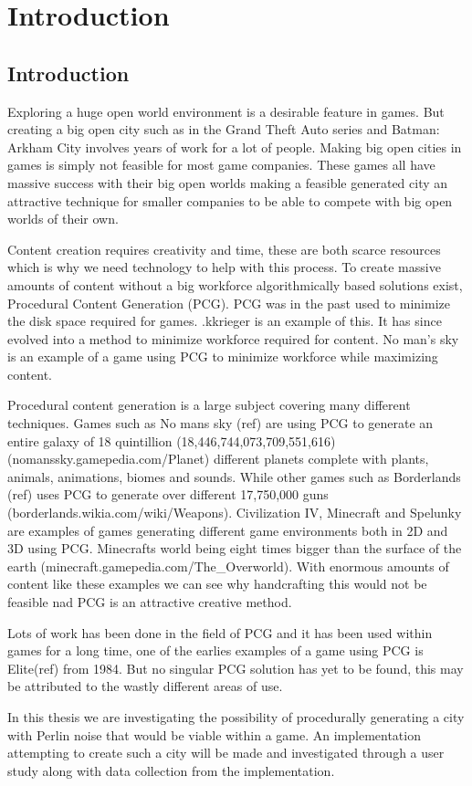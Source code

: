 \section{Introduction}
\subsection{Introduction}
Exploring a huge open world environment is a desirable feature in games. But creating a big open city such as in the Grand Theft Auto series and Batman: Arkham City involves years of work for a lot of people. Making big open cities in games is simply not feasible for most game companies. These games all have massive success with their big open worlds making a feasible generated city an attractive technique for smaller companies to be able to compete with big open worlds of their own.
\par
Content creation requires creativity and time, these are both scarce resources which is why we need technology to help with this process.
To create massive amounts of content without a big workforce algorithmically based solutions exist, Procedural Content Generation (PCG). PCG was in the past used to minimize the disk space required for games. .kkrieger is an  example of this. It has since evolved into a method to minimize workforce required for content. No man’s sky is an example of a game using PCG to minimize workforce while maximizing content.
\par
Procedural content generation is a large subject covering many different techniques. Games such as No mans sky (ref) are using PCG to generate an entire galaxy of 18 quintillion (18,446,744,073,709,551,616) (nomanssky.gamepedia.com/Planet) different planets complete with plants, animals, animations, biomes and sounds. While other games such as Borderlands (ref) uses PCG to generate over different 17,750,000 guns (borderlands.wikia.com/wiki/Weapons). Civilization IV, Minecraft and Spelunky are examples of games generating different game environments both in 2D and 3D using PCG. Minecrafts world being eight times bigger than the surface of the earth (minecraft.gamepedia.com/The\_Overworld). With enormous amounts of content like these examples we can see why handcrafting this would not be feasible nad PCG is an attractive creative method.
\par
Lots of work has been done in the field of PCG and it has been used within games for a long time, one of the earlies examples of a game using PCG is Elite(ref) from 1984. But no singular PCG solution has yet to be found, this may be attributed to the wastly different areas of use.
\par
In this thesis we are investigating the possibility of procedurally generating a city with Perlin noise that would be viable within a game. An implementation attempting to create such a city will be made and investigated through a user study along with data collection from the implementation.

